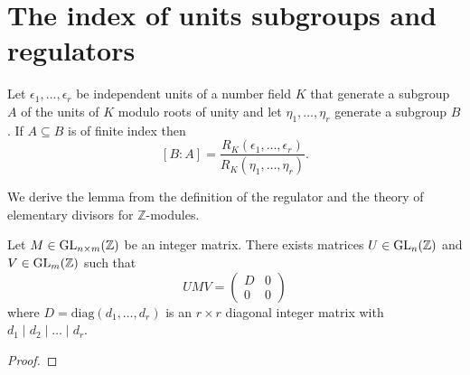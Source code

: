 \section{The index of units subgroups and regulators}

\begin{lemma}\label{lem:index_eq_reg_ratio}
    Let $\epsilon_1, \dots, \epsilon_r$ be independent units of a number field $K$ that generate a subgroup 
    $A$ of the units of $K$ modulo roots of unity and let $\eta_1, \dots, \eta_r$ generate a subgroup 
    $B$. If $A \subseteq B$ is of finite index then 
    $$
        [B : A] = \frac{R_K(\epsilon_1, \dots, \epsilon_r)}{R_K(\eta_1, \dots, \eta_r)}.
    $$
\end{lemma}

We derive the lemma from the definition of the regulator and the theory of elementary divisors for 
$\mathbb{Z}$-modules.

\begin{lemma}\label{lem:elem_divisors}
    \leanok
    Let $M \in \operatorname{GL}_{n \times m}(\mathbb{Z})$ be an integer matrix. 
    There exists matrices $U \in \operatorname{GL}_n(\mathbb{Z})$ and 
    $V \in \operatorname{GL}_m(\mathbb{Z})$ such that 
    $$
    U M V = 
    \begin{pmatrix}
        D & 0 \\
        0 & 0 
    \end{pmatrix}
    $$ 
    where $D = \textrm{diag}(d_1, \dots, d_r)$ is an $r \times r$ 
    diagonal integer matrix with $d_1 \mid d_2 \mid \dots \mid d_r$.  
\end{lemma}

\begin{proof}
    \leanok
\end{proof}

